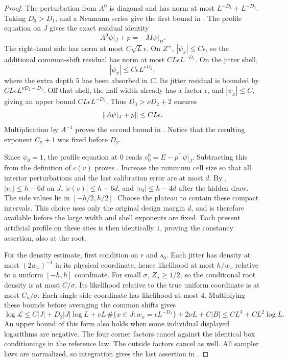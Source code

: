 \begin{proof}
The perturbation from $A^0$ is diagonal and has norm at most
$L^{-D_1}+L^{-D_3}$.  Taking $D_3>D_1$,  and a
Neumann series give the first bound in .
The profile equation on $J$ gives the exact residual identity
\[
 A^0\psi|_J+p=-M\psi|_B.
\]
The right-hand side has norm at most $C\sqrt L\epsilon$.  On $Z^+$,
$|\psi_x|\le C\epsilon$, so the additional common-shift residual has
norm at most $CL\epsilon L^{-D_1}$.  On the jitter shell,
\[
 |\psi_x|\le C\epsilon L^{\nu D_2},
\]
where the extra depth $5$ has been absorbed in $C$.  Its jitter residual
is bounded by $CL\epsilon L^{\nu D_2-D_3}$.  Off that shell, the
half-width already has a factor $\epsilon$, and $|\psi_x|\le C$,
giving an upper bound $CL\epsilon L^{-D_3}$.
Thus $D_3>\nu D_2+2$ ensures
\[
 \left\lVert A\psi|_J+p\right\rVert\le CL\epsilon.
\]
Multiplication by $A^{-1}$ proves the second bound in
.  Notice that the resulting exponent $C_2+1$
was fixed before $D_2$.

Since $\psi_0=1$, the profile equation at $0$ reads
$v_0^0=E-p^\top\psi|_J$.  Subtracting this from the definition of $c(v)$
proves .  Increase the minimum cell size so
that all interior perturbations and the last calibration error are at
most $d$.  By , $|v_x|\le h-6d$ on $J$,
$|c(v)|\le h-6d$, and $|v_0|\le h-4d$ after the hidden draw.
The side values lie in $[-h/2,h/2]$.  Choose the plateau to contain
these compact intervals.  This choice uses only the original design
margin $d$, and is therefore available before the large width and shell
exponents are fixed.  Each present artificial profile on these sites is
then identically $1$, proving the constancy assertion, also at the root.

For the density estimate, first condition on $r$ and $s_0$.  Each jitter
has density at most $(2w_x)^{-1}$ in its physical coordinate, hence
likelihood at most $h/w_x$ relative to a uniform $[-h,h]$ coordinate.
For small $\sigma$, $Z_\sigma\ge1/2$, so the conditional root density
is at most $C/\sigma$.  Its likelihood relative to the true uniform
coordinate is at most $C_h/\sigma$.  Each single side coordinate has
likelihood at most $4$.  Multiplying these bounds before averaging the
common shifts gives
\[
 \log\mathcal L
 \le C|J|+D_3|J|\log L+
       \nu L\,\#\{x\in J:w_x=\epsilon L^{-D_3}\}
       +2\nu L+C|B|
 \le C L^3+C L^2\log L.
\]
An upper bound of this form also holds when some individual displayed
logarithms are negative.  The four corner factors cancel against the
identical box conditionings in the reference law.  The outside factors
cancel as well.  All sampler laws are normalized, so integration gives
the last assertion in .
\end{proof}

